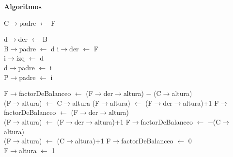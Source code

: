 \documentclass[a4paper,10pt]{article}
\newenvironment{Algoritmos}{%
  \vspace*{2ex}%
  \noindent\textbf{\Large Algoritmos}%
  \vspace*{2ex}%
}{}
\begin{document}
\begin{Algoritmos}
\begin{algorithm}[H]
{
{C$\rightarrow$padre $\leftarrow$ F}
{}
}

\end{algorithm}

\newpage
\begin{algorithm}[H]

{d$\rightarrow$der $\leftarrow$ B\\}
{
{B$\rightarrow$padre $\leftarrow$ d}
{}
}
{i$\rightarrow$der $\leftarrow$ F\\}
{i$\rightarrow$izq $\leftarrow$ d\\}
{d$\rightarrow$padre $\leftarrow$ i\\}
{P$\rightarrow$padre $\leftarrow$ i\\}

{
{
{F$\rightarrow$factorDeBalanceo $\leftarrow$
(F$\rightarrow$der$\rightarrow$altura) $-$ (C$\rightarrow$altura)\\
{
{(F$\rightarrow$altura) $\leftarrow$ C$\rightarrow$altura}
{(F$\rightarrow$altura) $\leftarrow$ (F$\rightarrow$der$\rightarrow$altura)+1}
}
}
{F$\rightarrow$factorDeBalanceo $\leftarrow$ (F$\rightarrow$der$\rightarrow$altura) \\
(F$\rightarrow$altura) $\leftarrow$ (F$\rightarrow$der$\rightarrow$altura)+1
}
}
{
{F$\rightarrow$factorDeBalanceo $\leftarrow$ $-$(C$\rightarrow$altura)\\
(F$\rightarrow$altura) $\leftarrow$ (C$\rightarrow$altura)+1}
{F$\rightarrow$factorDeBalanceo $\leftarrow$ 0\\
 F$\rightarrow$altura $\leftarrow$ 1}
}
}


\end{algorithm}
\end{Algoritmos}
\end{document}

